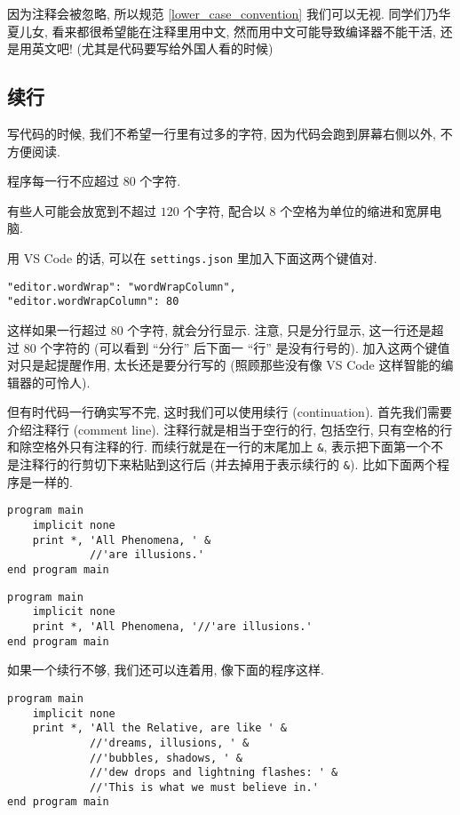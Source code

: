 因为注释会被忽略, 所以规范 \ref{lower_case_convention} 我们可以无视. 同学们乃华夏儿女, 看来都很希望能在注释里用中文, 然而用中文可能导致编译器不能干活, 还是用英文吧! (尤其是代码要写给外国人看的时候)

\subsection{续行}

写代码的时候, 我们不希望一行里有过多的字符, 因为代码会跑到屏幕右侧以外, 不方便阅读.
\begin{convention}
    程序每一行不应超过 $80$ 个字符.\label{fortran_no_more_than_80}
\end{convention}
有些人可能会放宽到不超过 $120$ 个字符, 配合以 8 个空格为单位的缩进和宽屏电脑.

用 VS Code 的话, 可以在 \texttt{settings.json} 里加入下面这两个键值对.
\begin{verbatim}
"editor.wordWrap": "wordWrapColumn",
"editor.wordWrapColumn": 80
\end{verbatim}
这样如果一行超过 80 个字符, 就会分行显示. 注意, 只是分行显示, 这一行还是超过 80 个字符的 (可以看到 ``分行'' 后下面一 ``行'' 是没有行号的). 加入这两个键值对只是起提醒作用, 太长还是要分行写的 (照顾那些没有像 VS Code 这样智能的编辑器的可怜人).

但有时代码一行确实写不完, 这时我们可以使用续行 (continuation). 首先我们需要介绍注释行 (comment line). 注释行就是相当于空行的行, 包括空行, 只有空格的行和除空格外只有注释的行. 而续行就是在一行的末尾加上 \texttt{\&{}}, 表示把下面第一个不是注释行的行剪切下来粘贴到这行后 (并去掉用于表示续行的 \texttt{\&{}}). 比如下面两个程序是一样的.
\begin{lstlisting}
program main
    implicit none
    print *, 'All Phenomena, ' &
             //'are illusions.'
end program main
\end{lstlisting}
\begin{lstlisting}
program main
    implicit none
    print *, 'All Phenomena, '//'are illusions.'
end program main
\end{lstlisting}
如果一个续行不够, 我们还可以连着用, 像下面的程序这样.
\begin{lstlisting}
program main
    implicit none
    print *, 'All the Relative, are like ' &
             //'dreams, illusions, ' &
             //'bubbles, shadows, ' &
             //'dew drops and lightning flashes: ' &
             //'This is what we must believe in.'
end program main
\end{lstlisting}

